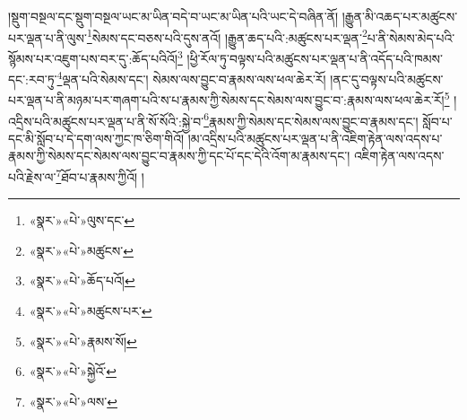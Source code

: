 །སྡུག་བསྔལ་དང་སྡུག་བསྔལ་ཡང་མ་ཡིན་བདེ་བ་ཡང་མ་ཡིན་པའི་ཡང་དེ་བཞིན་ནོ། །རྒྱུན་མི་འཆད་པར་མཚུངས་པར་ལྡན་པ་ནི་ལུས་\footnote{«སྣར་»«པེ་»ལུས་དང་}སེམས་དང་བཅས་པའི་དུས་ནའོ། །རྒྱུན་ཆད་པའི་:མཚུངས་པར་ལྡན་\footnote{«སྣར་»«པེ་»མཚུངས་}པ་ནི་སེམས་མེད་པའི་སྙོམས་པར་འཇུག་པས་བར་དུ་:ཆོད་པའིའོ།\footnote{«སྣར་»«པེ་»ཆོད་པའོ།} །ཕྱི་རོལ་ཏུ་བལྟས་པའི་མཚུངས་པར་ལྡན་པ་ནི་འདོད་པའི་ཁམས་དང་:རབ་ཏུ་\footnote{«སྣར་»«པེ་»མཚུངས་པར་}ལྡན་པའི་སེམས་དང་། སེམས་ལས་བྱུང་བ་རྣམས་ལས་ཕལ་ཆེར་རོ། །ནང་དུ་བལྟས་པའི་མཚུངས་པར་ལྡན་པ་ནི་མཉམ་པར་གཞག་པའི་ས་པ་རྣམས་ཀྱི་སེམས་དང་སེམས་ལས་བྱུང་བ་:རྣམས་ལས་ཕལ་ཆེར་རོ།\footnote{«སྣར་»«པེ་»རྣམས་སོ།} །འདྲིས་པའི་མཚུངས་པར་ལྡན་པ་ནི་སོ་སོའི་:སྐྱེ་བ་\footnote{«སྣར་»«པེ་»སྐྱེའོ་}རྣམས་ཀྱི་སེམས་དང་སེམས་ལས་བྱུང་བ་རྣམས་དང་། སློབ་པ་དང་མི་སློབ་པ་དེ་དག་ལས་ཀྱང་ཁ་ཅིག་གིའོ། །མ་འདྲིས་པའི་མཚུངས་པར་ལྡན་པ་ནི་འཇིག་རྟེན་ལས་འདས་པ་རྣམས་ཀྱི་སེམས་དང་སེམས་ལས་བྱུང་བ་རྣམས་ཀྱི་དང་པོ་དང་དེའི་འོག་མ་རྣམས་དང་། འཇིག་རྟེན་ལས་འདས་པའི་རྗེས་ལ་\footnote{«སྣར་»«པེ་»ལས་}ཐོབ་པ་རྣམས་ཀྱིའོ། །
